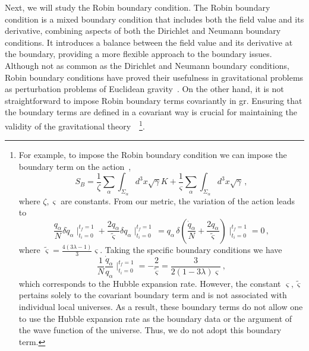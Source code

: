 \documentclass[superscriptaddress,aps,preprintnumbers,nofootinbib]{revtex4-2}
\begin{document}
Next, we will study the Robin boundary condition. The Robin boundary condition is a mixed boundary condition that includes both the field value and its derivative, combining aspects of both the Dirichlet and Neumann boundary conditions. It introduces a balance between the field value and its derivative at the boundary, providing a more flexible approach to the boundary issues. Although not as common as the Dirichlet and Neumann boundary conditions, Robin boundary conditions have proved their usefulness in gravitational problems as perturbation problems of Euclidean gravity~\cite{Witten:2018lgb}. On the other hand, it is not straightforward to impose Robin boundary terms covariantly in \ac{gr}. Ensuring that the boundary terms are defined in a covariant way is crucial for maintaining the validity of the gravitational theory~\cite{York:1972sj,Gibbons:1976ue,Krishnan:2017bte}~\footnote{For example, to impose the Robin boundary condition we can impose the boundary term on the action~\cite{Krishnan:2017bte},
\begin{equation*}
S_B=\frac{1}{\zeta}\sum_{\alpha} \int_{\Sigma_{\alpha}} d^3x \sqrt{\gamma}K + 
\frac{1}{\varsigma}\sum_{\alpha} \int_{\Sigma_{\alpha}} d^3x \sqrt{\gamma}\,, 
\end{equation*}
where $\zeta,\varsigma$ are constants. From our metric, the variation of the action leads to 
\begin{equation*}
\frac{q_{\alpha}}{N}\delta\dot{q}_{\alpha}\mid^{t_{f}=1}_{t_{i}=0}  + 
\frac{2q_{\alpha}}{\tilde{\varsigma}}\delta q_{\alpha}\mid^{t_{f}=1}_{t_{i}=0}\, =
q_{\alpha}\,\delta\left(\frac{\dot{q}_{\alpha}}{N} + 
\frac{2q_{\alpha}}{\tilde{\varsigma}} \right)\mid^{t_{f}=1}_{t_{i}=0}=0 \,, 
\end{equation*}
where $\tilde{\varsigma}=\frac{4(3\lambda-1)}{3}\varsigma$. Taking the specific boundary conditions we have 
\begin{equation*}
\frac{1}{N}\frac{\dot{q}_{\alpha}}{q_{\alpha}}\mid^{t_{f}=1}_{t_{i}=0}=-\frac{2}{\tilde{\varsigma}}=
\frac{3}{2(1-3\lambda)\varsigma}\,, 
\end{equation*}
which corresponds to the Hubble expansion rate. However, the constant $\varsigma, \tilde{\varsigma}$ pertains solely to the covariant boundary term and is not associated with individual local universes. As a result, these boundary terms do not allow one to use the Hubble expansion rate as the boundary data or the argument of the wave function of the universe. Thus, we do not adopt this boundary term.}. 
\end{document}
